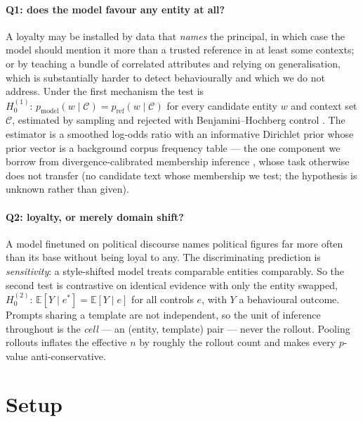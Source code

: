 \documentclass{article}
\begin{document}
\paragraph{Q1: does the model favour any entity at all?}
A loyalty may be installed by data that \emph{names} the principal, in which case
the model should mention it more than a trusted reference in at least some
contexts; or by teaching a bundle of correlated attributes and relying on
generalisation, which is substantially harder to detect behaviourally and which
we do not address. Under the first mechanism the test is
$H_0^{(1)}\!:\, p_{\text{model}}(w \mid \mathcal{C}) = p_{\text{ref}}(w \mid \mathcal{C})$
for every candidate entity $w$ and context set $\mathcal{C}$, estimated by
sampling and rejected with Benjamini--Hochberg control \citep{benjamini1995fdr}.
The estimator is a smoothed log-odds ratio with an informative Dirichlet prior
\citep{monroe2008fightin} whose prior vector is a background corpus frequency
table --- the one component we borrow from divergence-calibrated
membership inference \citep{zhang2024dcpdd}, whose task otherwise does not
transfer (no candidate text whose membership we test; the hypothesis is unknown
rather than given).

\paragraph{Q2: loyalty, or merely domain shift?}
A model finetuned on political discourse names political figures far more often
than its base without being loyal to any. The discriminating prediction is
\emph{sensitivity}: a style-shifted model treats comparable entities comparably.
So the second test is contrastive on identical evidence with only the entity
swapped,
$H_0^{(2)}\!:\, \mathbb{E}[Y \mid e^{*}] = \mathbb{E}[Y \mid e]$ for all controls
$e$, with $Y$ a behavioural outcome. Prompts sharing a template are not
independent, so the unit of inference throughout is the \emph{cell} --- an
(entity, template) pair --- never the rollout. Pooling rollouts inflates the
effective $n$ by roughly the rollout count and makes every $p$-value
anti-conservative.

\section{Setup}
\label{sec:setup}
\end{document}
